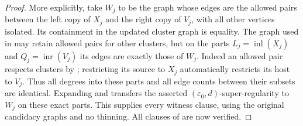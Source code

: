 \begin{proof}
More explicitly, take $W_j$ to be the graph whose edges are the allowed
pairs between the left copy of $X_j$ and the right copy of $V_j$, with
all other vertices isolated. Its containment in the updated cluster
graph is equality. The graph used in 
may retain allowed pairs for other clusters, but on the parts
$L_j=\operatorname{inl}(X_j)$ and $Q_j=\operatorname{inr}(V_j)$ its
edges are exactly those of $W_j$. Indeed an allowed pair respects
clusters by ; restricting its source to $X_j$
automatically restricts its host to $V_j$. Thus all degrees into these
parts and all edge counts between their subsets are identical.
Expanding  and  transfers
the asserted $(\varepsilon_0,d)$-super-regularity to $W_j$ on these
exact parts. This supplies every witness clause, using the original
candidacy graphs and no thinning. All clauses of
 are now verified.
\end{proof}
